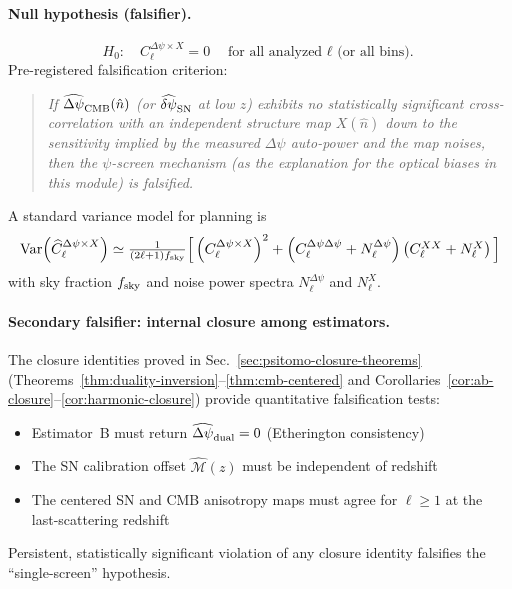 \paragraph{Null hypothesis (falsifier).}
\begin{equation}
H_0:\quad C_\ell^{\Delta\psi\times X}=0\quad \text{for all analyzed $\ell$ (or all bins).}
\label{eq:psitomo-null}
\end{equation}
Pre-registered falsification criterion:
\begin{quote}
\emph{If $\widehat{\Delta\psi}_{\rm CMB}(\hat n)$ (or $\widehat{\delta\psi}_{\rm SN}$ at low $z$) exhibits no statistically significant cross-correlation with an independent structure map $X(\hat n)$ down to the sensitivity implied by the measured $\Delta\psi$ auto-power and the map noises, then the $\psi$-screen mechanism (as the explanation for the optical biases in this module) is falsified.}
\end{quote}

A standard variance model for planning is
\begin{equation}
\resizebox{\columnwidth}{!}{$
\mathrm{Var}\!\left(\widehat C_\ell^{\Delta\psi\times X}\right)
\simeq \frac{1}{(2\ell+1)f_{\rm sky}}
\Big[
\left(C_\ell^{\Delta\psi\times X}\right)^2
+\left(C_\ell^{\Delta\psi\Delta\psi}+N_\ell^{\Delta\psi}\right)
\left(C_\ell^{XX}+N_\ell^{X}\right)
\Big]
$}
\label{eq:psitomo-cl-var}
\end{equation}
with sky fraction $f_{\rm sky}$ and noise power spectra $N_\ell^{\Delta\psi}$ and $N_\ell^{X}$.

\paragraph{Secondary falsifier: internal closure among estimators.}
The closure identities proved in Sec.~\ref{sec:psitomo-closure-theorems} (Theorems~\ref{thm:duality-inversion}--\ref{thm:cmb-centered} and Corollaries~\ref{cor:ab-closure}--\ref{cor:harmonic-closure}) provide quantitative falsification tests:
\begin{itemize}
\item Estimator~B must return $\widehat{\Delta\psi}_{\rm dual}=0$ (Etherington consistency)
\item The SN calibration offset $\widehat{\mathcal{M}}(z)$ must be independent of redshift
\item The centered SN and CMB anisotropy maps must agree for $\ell \ge 1$ at the last-scattering redshift
\end{itemize}
Persistent, statistically significant violation of any closure identity falsifies the ``single-screen'' hypothesis.

